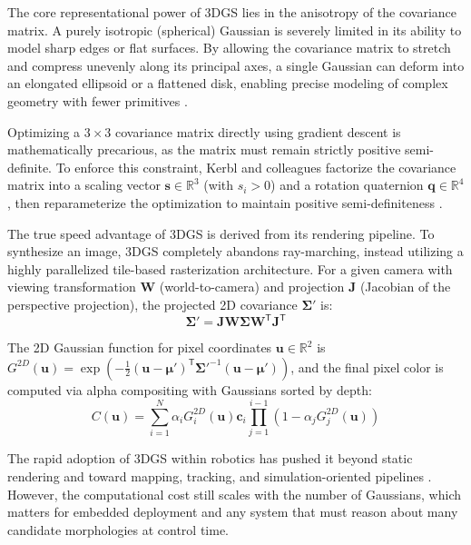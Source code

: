 \documentclass[12pt,a4paper,oneside]{report}
\begin{document}
The core representational power of 3DGS lies in the anisotropy of the covariance matrix. A purely isotropic (spherical) Gaussian is severely limited in its ability to model sharp edges or flat surfaces. By allowing the covariance matrix to stretch and compress unevenly along its principal axes, a single Gaussian can deform into an elongated ellipsoid or a flattened disk, enabling precise modeling of complex geometry with fewer primitives \cite{kerbl20233d}.

Optimizing a $3 \times 3$ covariance matrix directly using gradient descent is mathematically precarious, as the matrix must remain strictly positive semi-definite. To enforce this constraint, Kerbl and colleagues factorize the covariance matrix into a scaling vector $\mathbf{s} \in \mathbb{R}^3$ (with $s_i > 0$) and a rotation quaternion $\mathbf{q} \in \mathbb{R}^4$, then reparameterize the optimization to maintain positive semi-definiteness \cite{kerbl20233d}.

The true speed advantage of 3DGS is derived from its rendering pipeline. To synthesize an image, 3DGS completely abandons ray-marching, instead utilizing a highly parallelized tile-based rasterization architecture. For a given camera with viewing transformation $\mathbf{W}$ (world-to-camera) and projection $\mathbf{J}$ (Jacobian of the perspective projection), the projected 2D covariance $\boldsymbol{\Sigma}'$ is:
\begin{equation}
\boldsymbol{\Sigma}' = \mathbf{J} \mathbf{W} \boldsymbol{\Sigma} \mathbf{W}^\mathsf{T} \mathbf{J}^\mathsf{T}
\end{equation}

The 2D Gaussian function for pixel coordinates $\mathbf{u} \in \mathbb{R}^2$ is $G^{2D}(\mathbf{u}) = \exp\left(-\frac{1}{2} (\mathbf{u} - \boldsymbol{\mu}')^\mathsf{T} \boldsymbol{\Sigma}'^{-1} (\mathbf{u} - \boldsymbol{\mu}')\right)$, and the final pixel color is computed via alpha compositing with Gaussians sorted by depth:
\begin{equation}
C(\mathbf{u}) = \sum_{i=1}^{N} \alpha_i G_i^{2D}(\mathbf{u}) \mathbf{c}_i \prod_{j=1}^{i-1} (1 - \alpha_j G_j^{2D}(\mathbf{u}))
\end{equation}

The rapid adoption of 3DGS within robotics has pushed it beyond static rendering and toward mapping, tracking, and simulation-oriented pipelines \cite{matsuki2024gaussian, keetha2024splattam, guedon2024sugar, lassanske2024gaurast}. However, the computational cost still scales with the number of Gaussians, which matters for embedded deployment and any system that must reason about many candidate morphologies at control time.
\end{document}
